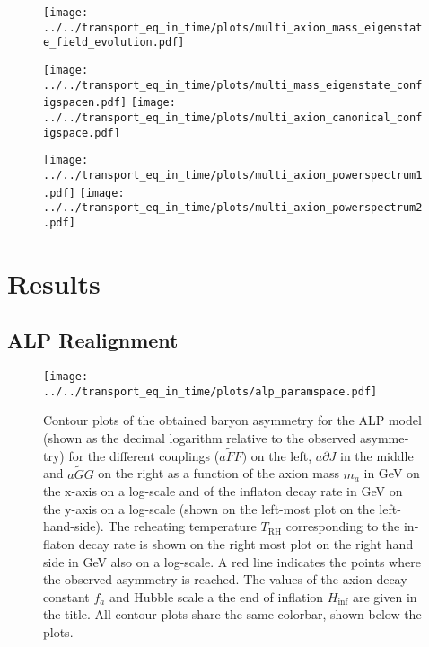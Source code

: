 \documentclass[master,       %
               twoside,        %
               BCOR10mm,       %
               english,ngerman, %
               ]{GAUBM}
\begin{document}
\begin{otherlanguage}{english}
\begin{figure}[h]
    \texttt{[image: ../../transport\_eq\_in\_time/plots/multi\_axion\_mass\_eigenstate\_field\_evolution.pdf]}
    \caption{}
\end{figure}

\begin{figure}[h]
    \texttt{[image: ../../transport\_eq\_in\_time/plots/multi\_mass\_eigenstate\_configspacen.pdf]}
    \texttt{[image: ../../transport\_eq\_in\_time/plots/multi\_axion\_canonical\_configspace.pdf]}
    \caption{}
\end{figure}

\begin{figure}[h]
    \texttt{[image: ../../transport\_eq\_in\_time/plots/multi\_axion\_powerspectrum1.pdf]}
    \texttt{[image: ../../transport\_eq\_in\_time/plots/multi\_axion\_powerspectrum2.pdf]}
    \caption{}
\end{figure}






\chapter{Results}

\section{ALP Realignment}

\begin{figure}[h]
    \texttt{[image: ../../transport\_eq\_in\_time/plots/alp\_paramspace.pdf]}
    \caption{Contour plots of the obtained baryon asymmetry  for the ALP model (shown as the decimal logarithm relative to the observed asymmetry) for the different couplings ($a\tilde{F}F)$ on the left, $a\partial J$ in the middle and $a \tilde{G} G$ on the right as a function of the axion mass $m_a$ in GeV on the x-axis on a log-scale and of the inflaton decay rate in GeV on the y-axis on a log-scale (shown on the left-most plot on the left-hand-side). The reheating temperature $T_\mathrm{RH}$ corresponding to the inflaton decay rate is shown on the right most plot on the right hand side in GeV also on a log-scale. A red line indicates the points where the observed asymmetry is reached. The values of the axion decay constant $f_a$ and Hubble scale a the end of inflation $H_\mathrm{inf}$ are given in the title. All contour plots share the same colorbar, shown below the plots.}
\end{figure}


\end{otherlanguage}
\end{document}
